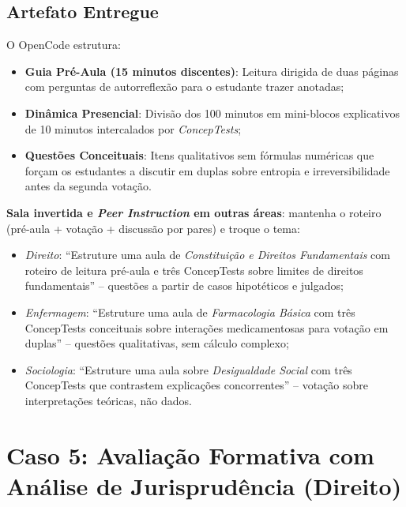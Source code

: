 \subsection{Artefato Entregue}
O OpenCode estrutura:
\begin{itemize}
  \item \textbf{Guia Pr{\'e}-Aula (15 minutos discentes)}: Leitura dirigida de duas p{\'a}ginas com perguntas de autorreflex{\~a}o para o estudante trazer anotadas;
  \item \textbf{Din{\^a}mica Presencial}: Divis{\~a}o dos 100 minutos em mini-blocos explicativos de 10 minutos intercalados por \emph{ConcepTests};
  \item \textbf{Quest{\~o}es Conceituais}: Itens qualitativos sem f{\'o}rmulas num{\'e}ricas que for{\c c}am os estudantes a discutir em duplas sobre entropia e irreversibilidade antes da segunda vota{\c c}{\~a}o.
\end{itemize}

\begin{adaptacaoarea}
\textbf{Sala invertida e \emph{Peer Instruction} em outras {\'a}reas}: mantenha o roteiro (pr{\'e}-aula + vota{\c c}{\~a}o + discuss{\~a}o por pares) e troque o tema:
\begin{itemize}
  \item \emph{Direito}: ``Estruture uma aula de \emph{Constitui{\c c}{\~a}o e Direitos Fundamentais} com roteiro de leitura pr{\'e}-aula e tr{\^e}s ConcepTests sobre limites de direitos fundamentais'' -- quest{\~o}es a partir de casos hipot{\'e}ticos e julgados;
  \item \emph{Enfermagem}: ``Estruture uma aula de \emph{Farmacologia B{\'a}sica} com tr{\^e}s ConcepTests conceituais sobre intera{\c c}{\~o}es medicamentosas para vota{\c c}{\~a}o em duplas'' -- quest{\~o}es qualitativas, sem c{\'a}lculo complexo;
  \item \emph{Sociologia}: ``Estruture uma aula sobre \emph{Desigualdade Social} com tr{\^e}s ConcepTests que contrastem explica{\c c}{\~o}es concorrentes'' -- vota{\c c}{\~a}o sobre interpreta{\c c}{\~o}es te{\'o}ricas, n{\~a}o dados.
\end{itemize}
\end{adaptacaoarea}

\section{Caso 5: Avalia{\c c}{\~a}o Formativa com An{\'a}lise de Jurisprud{\^e}ncia (Direito)}

